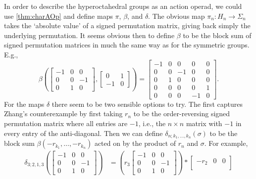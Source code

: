 \begin{example}
In order to describe the hyperoctahedral groups as an action operad, we could use \cref{thm:charAOp} and define maps $\pi$, $\beta$, and $\delta$. The obvious map $\pi_n \colon H_n \rightarrow \Sigma_n$ takes the `absolute value' of a signed permutation matrix, giving back simply the underlying permutation. It seems obvious then to define $\beta$ to be the block sum of signed permutation matrices in much the same way as for the symmetric groups. E.g.,
  \[
    \beta\left(
      \begin{bmatrix}
      -1 & 0 & 0 \\
      0 & 0 & -1 \\
      0 & 1 & 0
      \end{bmatrix},
      \begin{bmatrix}
      0 & 1 \\
      -1 & 0
      \end{bmatrix}
    \right)
    =
    \begin{bmatrix}
      -1 &  0 &  0 &  0 & 0 \\
      0  &  0 & -1 &  0 & 0 \\
      0  &  1 &  0 &  0 & 0 \\
      0  &  0 &  0 &  0 & 1 \\
      0  &  0 &  0 & -1 & 0
    \end{bmatrix}.
  \]
For the maps $\delta$ there seem to be two sensible options to try. The first captures Zhang's counterexample by first taking $r_n$ to be the order-reversing signed permutation matrix where all entries are $-1$, i.e., the $n \times n$ matrix with $-1$ in every entry of the anti-diagonal. Then we can define $\delta_{n;k_1,\ldots,k_n}(\sigma)$ to be the block sum $\beta(-r_{k_1},\ldots,-r_{k_n})$ acted on by the product of $r_n$ and $\sigma$. For example,
  \begin{align*}
    \delta_{3;2,1,3}\left(
    \begin{bmatrix}
      -1 & 0 & 0 \\
      0 & 0 & -1 \\
      0 & 1 & 0
      \end{bmatrix}
      \right)
      &=
      \left(
      r_3
      \begin{bmatrix}
      -1 & 0 & 0 \\
      0 & 0 & -1 \\
      0 & 1 & 0
      \end{bmatrix}
      \right)
      \ast
      \begin{bmatrix}
      -r_2 & 0 & 0 \\

\end{bmatrix}
\end{align*}
\end{example}
